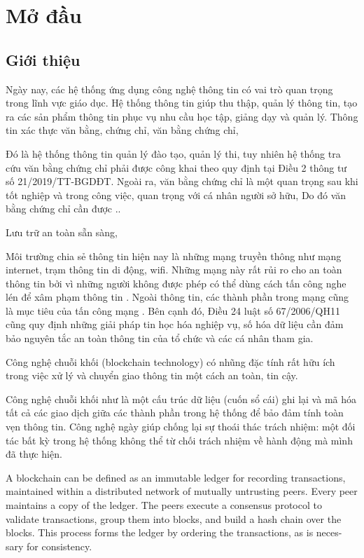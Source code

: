 \chapter{Mở đầu}

\section{Giới thiệu}
Ngày nay, các hệ thống ứng dụng công nghệ thông tin có vai trò quan trọng trong lĩnh vực giáo dục.
Hệ thống thông tin giúp thu thập, quản lý thông tin, tạo ra các sản phẩm thông tin phục vụ nhu cầu học tập, giảng dạy và quản lý. 
Thông tin xác thực văn bằng, chứng chỉ, văn bằng chứng chỉ, 

Đó là hệ thống thông tin quản lý đào tạo, quản lý thi, tuy nhiên hệ thống tra cứu văn bằng chứng chỉ phải được công khai theo quy định tại Điều 2 thông tư số 21/2019/TT-BGDĐT.
Ngoài ra, văn bằng chứng chỉ là một quan trọng sau khi tốt nghiệp và trong công việc, quan trọng với cá nhân người sở hữu, Do đó văn bằng chứng chỉ cần được ..

Lưu trữ an toàn sẵn sàng, 

Môi trường chia sẻ thông tin hiện nay là những mạng truyền thông như mạng internet, trạm thông tin di động, wifi.
Những mạng này rất rủi ro cho an toàn thông tin bởi vì những người không được phép có thể dùng cách tấn công nghe lén để xâm phạm thông tin \cite{phạmnguyênkhang2013}.
Ngoài thông tin, các thành phần trong mạng cũng là mục tiêu của tấn công mạng \cite{dothanhnghi2018}.
Bên cạnh đó, Điều 24 luật số 67/2006/QH11 cũng quy định những giải pháp tin học hóa nghiệp vụ, số hóa dữ liệu cần đảm bảo nguyên tắc an toàn thông tin của tổ chức và các cá nhân tham gia.


Công nghệ chuỗi khối (blockchain technology) có nhũng đặc tính rất hữu ích trong việc xử lý và chuyển giao thông tin một cách an toàn, tin cậy.

Công nghệ chuỗi khối như là một cấu trúc dữ liệu (cuốn sổ cái) ghi lại và mã hóa tất cả các giao dịch giữa các thành phần trong hệ thống để bảo đảm tính toàn vẹn thông tin. Công nghệ ngày giúp chống lại sự thoái thác trách nhiệm: một đối tác bất kỳ trong hệ thống không thể từ chối trách nhiệm về hành động mà mình đã thực hiện.


A blockchain can be defined as an immutable ledger for recording transactions, maintained within a distributed network of mutually untrusting peers. Every peer maintains a copy of the ledger. The peers execute a consensus protocol to validate transactions, group them into blocks, and build a hash chain over the blocks. This process forms the ledger by ordering the transactions, as is neces- sary for consistency.


